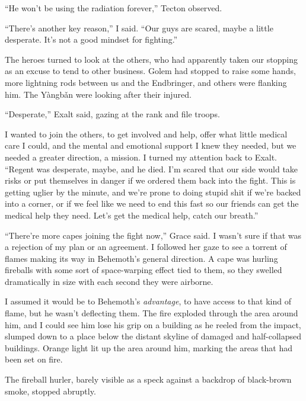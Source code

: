 ``He won't be using the radiation forever,'' Tecton observed.



``There's another key reason,'' I said.  ``Our guys are scared, maybe a little desperate.  It's not a good mindset for fighting.''



The heroes turned to look at the others, who had apparently taken our stopping as an excuse to tend to other business.  Golem had stopped to raise some hands, more lightning rods between us and the Endbringer, and others were flanking him.  The Y\`{a}ngb\v{a}n were looking after their injured.



``Desperate,'' Exalt said, gazing at the rank and file troops.



I wanted to join the others, to get involved and help, offer what little medical care I could, and the mental and emotional support I knew they needed, but we needed a greater direction, a mission.  I turned my attention back to Exalt.  ``Regent was desperate, maybe, and he died.  I'm scared that our side would take risks or put themselves in danger if we ordered them back into the fight.  This is getting uglier by the minute, and we're prone to doing stupid shit if we're backed into a corner, or if we feel like we need to end this fast so our friends can get the medical help they need.  Let's get the medical help, catch our breath.''



``There're more capes joining the fight now,'' Grace said.  I wasn't sure if that was a rejection of my plan or an agreement.  I followed her gaze to see a torrent of flames making its way in Behemoth's general direction.  A cape was hurling fireballs with some sort of space-warping effect tied to them, so they swelled dramatically in size with each second they were airborne.



I assumed it would be to Behemoth's \emph{advantage}, to have access to that kind of flame, but he wasn't deflecting them.  The fire exploded through the area around him, and I could see him lose his grip on a building as he reeled from the impact, slumped down to a place below the distant skyline of damaged and half-collapsed buildings.  Orange light lit up the area around him, marking the areas that had been set on fire.



The fireball hurler, barely visible as a speck against a backdrop of black-brown smoke, stopped abruptly.



